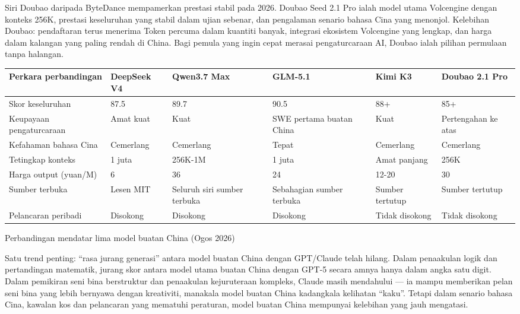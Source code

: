 
Siri Doubao daripada ByteDance mempamerkan prestasi stabil pada 2026. Doubao Seed 2.1 Pro ialah model utama Volcengine dengan konteks 256K, prestasi keseluruhan yang stabil dalam ujian sebenar, dan pengalaman senario bahasa Cina yang menonjol. Kelebihan Doubao: pendaftaran terus menerima Token percuma dalam kuantiti banyak, integrasi ekosistem Volcengine yang lengkap, dan harga dalam kalangan yang paling rendah di China. Bagi pemula yang ingin cepat merasai pengaturcaraan AI, Doubao ialah pilihan permulaan tanpa halangan.

\begin{center}
\begin{tabularx}{\linewidth}{|X|X|X|X|X|X|}
\hline
\textbf{Perkara perbandingan} & \textbf{DeepSeek V4} & \textbf{Qwen3.7 Max} & \textbf{GLM-5.1} & \textbf{Kimi K3} & \textbf{Doubao 2.1 Pro} \tabularnewline
\hline
Skor keseluruhan & 87.5 & 89.7 & 90.5 & 88+ & 85+ \tabularnewline
Keupayaan pengaturcaraan & Amat kuat & Kuat & SWE pertama buatan China & Kuat & Pertengahan ke atas \tabularnewline
Kefahaman bahasa Cina & Cemerlang & Cemerlang & Tepat & Cemerlang & Cemerlang \tabularnewline
Tetingkap konteks & 1 juta & 256K-1M & 1 juta & Amat panjang & 256K \tabularnewline
Harga output (yuan/M) & 6 & 36 & 24 & 12-20 & 30 \tabularnewline
Sumber terbuka & Lesen MIT & Seluruh siri sumber terbuka & Sebahagian sumber terbuka & Sumber tertutup & Sumber tertutup \tabularnewline
Pelancaran peribadi & Disokong & Disokong & Disokong & Tidak disokong & Tidak disokong \tabularnewline
\hline
\end{tabularx}
\end{center}

\begin{center}\small\color{gray}Perbandingan mendatar lima model buatan China (Ogos 2026)\end{center}

Satu trend penting: “rasa jurang generasi” antara model buatan China dengan GPT/Claude telah hilang. Dalam penaakulan logik dan pertandingan matematik, jurang skor antara model utama buatan China dengan GPT-5 secara amnya hanya dalam angka satu digit. Dalam pemikiran seni bina berstruktur dan penaakulan kejuruteraan kompleks, Claude masih mendahului — ia mampu memberikan pelan seni bina yang lebih bernyawa dengan kreativiti, manakala model buatan China kadangkala kelihatan “kaku”. Tetapi dalam senario bahasa Cina, kawalan kos dan pelancaran yang mematuhi peraturan, model buatan China mempunyai kelebihan yang jauh mengatasi.

